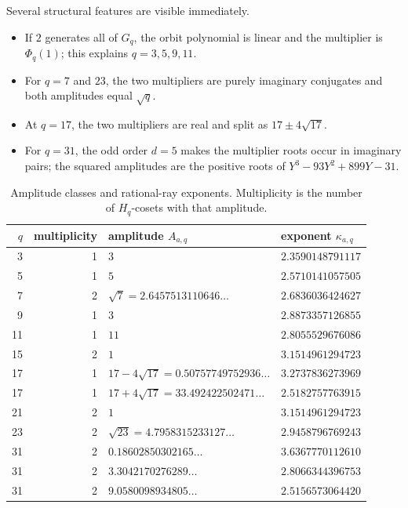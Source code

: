 \documentclass[11pt,oneside]{article}
\theoremstyle{definition}
\theoremstyle{remark}
\begin{document}
Several structural features are visible immediately.
\begin{itemize}
 \item If $2$ generates all of $G_q$, the orbit polynomial is linear and the
 multiplier is $\Phi_q(1)$; this explains $q=3,5,9,11$.
 \item For $q=7$ and $23$, the two multipliers are purely imaginary conjugates and
 both amplitudes equal $\sqrt q$.
 \item At $q=17$, the two multipliers are real and split as $17\pm4\sqrt{17}$.
 \item For $q=31$, the odd order $d=5$ makes the multiplier roots occur in imaginary
 pairs; the squared amplitudes are the positive roots of
 $Y^3-93Y^2+899Y-31$.
\end{itemize}

\begin{table}[ht]
\centering\footnotesize
\begin{tabularx}{\textwidth}{@{}r r X X@{}}
\toprule
$q$ & multiplicity & amplitude $A_{a,q}$ & exponent $\kappa_{a,q}$ \\
\midrule
3  & 1 & $3$ & $2.3590148791117$ \\
5  & 1 & $5$ & $2.5710141057505$ \\
7  & 2 & $\sqrt7=2.6457513110646\ldots$ & $2.6836036424627$ \\
9  & 1 & $3$ & $2.8873357126855$ \\
11 & 1 & $11$ & $2.8055529676086$ \\
15 & 2 & $1$ & $3.1514961294723$ \\
17 & 1 & $17-4\sqrt{17}=0.50757749752936\ldots$ & $3.2737836273969$ \\
17 & 1 & $17+4\sqrt{17}=33.492422502471\ldots$ & $2.5182757763915$ \\
21 & 2 & $1$ & $3.1514961294723$ \\
23 & 2 & $\sqrt{23}=4.7958315233127\ldots$ & $2.9458796769243$ \\
31 & 2 & $0.18602850302165\ldots$ & $3.6367770112610$ \\
31 & 2 & $3.3042170276289\ldots$ & $2.8066344396753$ \\
31 & 2 & $9.0580098934805\ldots$ & $2.5156573064420$ \\
\bottomrule
\end{tabularx}
\caption{Amplitude classes and rational-ray exponents. Multiplicity is the number
of $H_q$-cosets with that amplitude.}
\label{p2:tab:ray-exponents}
\end{table}
\end{document}
